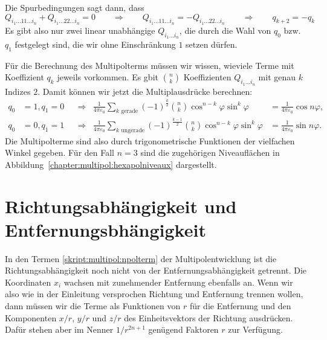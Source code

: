 Die Spurbedingungen sagt dann, dass
\[
Q_{i_1\dots 11\dots i_n}
+
Q_{i_1\dots 22\dots i_n}
=
0
\qquad\Rightarrow\qquad
Q_{i_1\dots 11\dots i_n}
=-
Q_{i_1\dots 22\dots i_n}
\qquad\Rightarrow\qquad
q_{k+2}=-q_k
\]
Es gibt also nur zwei linear unabhängige $Q_{i_1\dots i_n}$, die durch
die Wahl von $q_0$ bzw.~$q_1$ festgelegt sind, die wir ohne Einschränkung
$1$ setzen dürfen.

Für die Berechnung des Multipolterms müssen wir wissen, wieviele Terme 
mit Koeffizient $q_k$ jeweils vorkommen.
Es gbit $\binom{n}{k}$ Koeffizienten $Q_{i_1\dots i_n}$ mit genau $k$
Indizes $2$.
Damit können wir jetzt die Multiplausdrücke berechnen:
\begin{align*}
q_0&=1, q_1=0
&
&\Rightarrow&
\frac{1}{4\pi\varepsilon_0}
\sum_{\text{$k$ gerade}} (-1)^{\frac{k}2}\binom{n}{k}
	\cos^{n-k}\varphi \sin^k\varphi
&=
\frac{1}{4\pi\varepsilon_0}
\cos n\varphi,
\\
q_0&=0, q_1=1
&
&\Rightarrow&
\frac{1}{4\pi\varepsilon_0}
\sum_{\text{$k$ ungerade}} (-1)^{\frac{k-1}2}\binom{n}{k}
	\cos^{n-k}\varphi \sin^k\varphi
&=
\frac{1}{4\pi\varepsilon_0}
\sin n\varphi.
\end{align*}
Die Multipolterme sind also durch trigonometrische Funktionen der
vielfachen Winkel gegeben.
Für den Fall $n=3$ sind die zugehörigen Niveauflächen in
Abbildung~\ref{chapter:multipol:hexapolniveaux} dargestellt.

\section{Richtungsabhängigkeit und Entfernungsbhängigkeit}
In den Termen \eqref{skript:multipol:npolterm} der Multipolentwicklung
ist die Richtungsabhängigkeit noch nicht von der Entfernungsabhängigkeit
getrennt.
Die Koordinaten $x_i$ wachsen mit zunehmender Entfernung ebenfalls an.
Wenn wir also wie in der Einleitung versprochen Richtung und Entfernung
trennen wollen, dann müssen wir die Terme als Funktionen von $r$ für die
Entfernung und den Komponenten $x/r$, $y/r$ und $z/r$ des Einheitsvektors
der Richtung ausdrücken.
Dafür stehen aber im Nenner $1/r^{2n+1}$ genügend Faktoren $r$ zur Verfügung.

